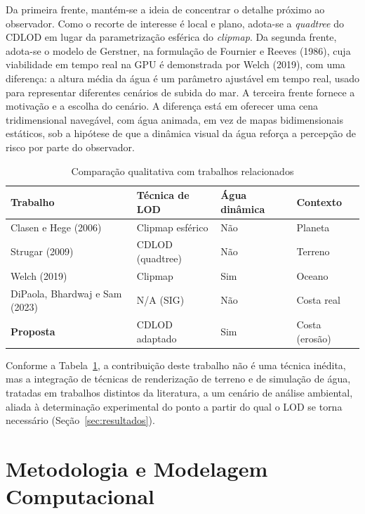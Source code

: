 \documentclass[conference]{IEEEtran}
\newcommand{\fonte}[1]{\par\vspace{2pt}{\footnotesize Fonte: #1\par}}
\begin{document}
Da primeira frente, mantém-se a ideia de concentrar o detalhe próximo ao
observador. Como o recorte de interesse é local e plano, adota-se a
\emph{quadtree} do CDLOD em lugar da parametrização esférica do
\emph{clipmap}. Da segunda frente, adota-se o modelo de Gerstner, na
formulação de Fournier e Reeves (1986), cuja viabilidade em tempo real na GPU é demonstrada por Welch
(2019), com uma diferença: a altura média
da água é um parâmetro ajustável em tempo real, usado para representar
diferentes cenários de subida do mar. A terceira frente fornece a motivação
e a escolha do cenário. A diferença está em oferecer uma cena
tridimensional navegável, com água animada, em vez de mapas bidimensionais
estáticos, sob a hipótese de que a dinâmica visual da água reforça a
percepção de risco por parte do observador.

\begin{table}[t]
\caption{Comparação qualitativa com trabalhos relacionados}
\label{tab:comparacao}
\centering
\begin{tabular}{@{}p{2.5cm}p{2.0cm}p{1.6cm}p{1.5cm}@{}}
\toprule
\textbf{Trabalho} & \textbf{Técnica de LOD} & \textbf{Água dinâmica} & \textbf{Contexto} \\
\midrule
Clasen e Hege (2006) & Clipmap esférico & Não & Planeta \\
Strugar (2009) & CDLOD (quadtree) & Não & Terreno \\
Welch (2019) & Clipmap & Sim & Oceano \\
DiPaola, Bhardwaj e Sam (2023) & N/A (SIG) & Não & Costa real \\
\textbf{Proposta} & CDLOD adaptado & Sim & Costa (erosão) \\
\bottomrule
\end{tabular}
\fonte{Elaborado pelos autores (2026).}
\end{table}

Conforme a Tabela~\ref{tab:comparacao}, a contribuição deste trabalho não é
uma técnica inédita, mas a integração de técnicas de renderização de
terreno e de simulação de água, tratadas em trabalhos distintos da literatura, a um cenário de análise ambiental, aliada à
determinação experimental do ponto a partir do qual o LOD se torna
necessário (Seção~\ref{sec:resultados}).

\section{Metodologia e Modelagem Computacional}
\label{sec:metod}
\end{document}
